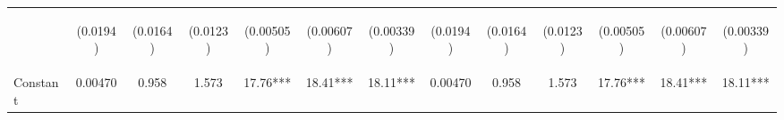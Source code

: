 \documentclass[]{article}
\begin{document}
\begin{center}
\begin{tabular}{lcccccccccccc}
\vspace{4pt} & \begin{footnotesize}(0.0194)\end{footnotesize} & \begin{footnotesize}(0.0164)\end{footnotesize} & \begin{footnotesize}(0.0123)\end{footnotesize} & \begin{footnotesize}(0.00505)\end{footnotesize} & \begin{footnotesize}(0.00607)\end{footnotesize} & \begin{footnotesize}(0.00339)\end{footnotesize} & \begin{footnotesize}(0.0194)\end{footnotesize} & \begin{footnotesize}(0.0164)\end{footnotesize} & \begin{footnotesize}(0.0123)\end{footnotesize} & \begin{footnotesize}(0.00505)\end{footnotesize} & \begin{footnotesize}(0.00607)\end{footnotesize} & \begin{footnotesize}(0.00339)\end{footnotesize} \\
Constant & 0.00470 & 0.958 & 1.573 & 17.76*** & 18.41*** & 18.11*** & 0.00470 & 0.958 & 1.573 & 17.76*** & 18.41*** & 18.11*** \\

\end{tabular}
\end{center}
\end{document}
